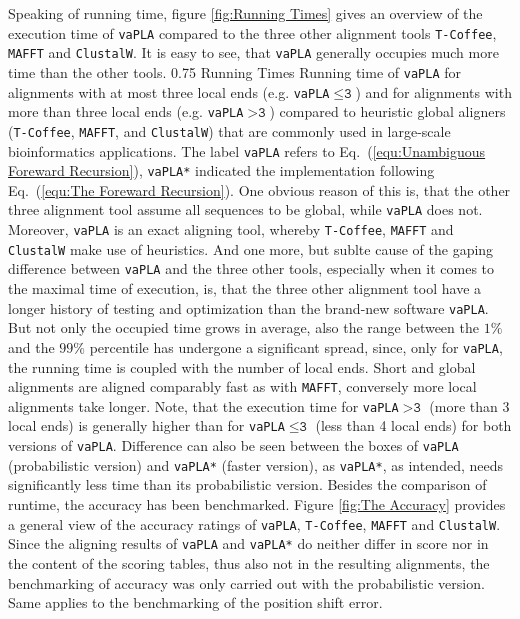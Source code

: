 \documentclass[a4paper,10pt]{thesis}
\newcommand{\software}{\texttt{vaPLA}}
\newcommand{\softwareS}{\software\born}
\newcommand{\softwareSmaller}{\software$\le\!\!\texttt{3}$}
\newcommand{\softwareBigger}{\software$>\!\!\texttt{3}$}
\newcommand{\born}{\texttt{*}}
\begin{document}
{{    Speaking of running time, figure \ref{fig:Running Times} gives an overview of the execution time of \software{} compared to the three other alignment tools \texttt{T-Coffee}, \texttt{MAFFT} and \texttt{ClustalW}. It is easy to see, that \software{} generally occupies much more time than the other tools.
    {0.75\textwidth}
    {Running Times}
    {Running time of \software{} for alignments with at most three local ends (e.g. \softwareSmaller{}) and for alignments with more than three local ends (e.g. \softwareBigger{}) compared to heuristic global aligners (\texttt{T-Coffee}, \texttt{MAFFT}, and \texttt{ClustalW}) that are commonly used in large-scale bioinformatics applications. The label \software{} refers to Eq.~(\ref{equ:Unambiguous Foreward Recursion}),  \softwareS{} indicated the implementation following Eq.~(\ref{equ:The Foreward Recursion}).}%
    One obvious reason of this is, that the other three alignment tool assume all sequences to be global, while \software{} does not. Moreover, \software{} is an exact aligning tool, whereby \texttt{T-Coffee}, \texttt{MAFFT} and \texttt{ClustalW} make use of heuristics. And one more, but sublte cause of the gaping difference between \software{} and the three other tools, especially when it comes to the maximal time of execution, is, that the three other alignment tool have a longer history of testing and optimization than the brand-new software \software{}.
    \gapSmall
    But not only the occupied time grows in average, also the range between the $1\%$ and the $99\%$ percentile has undergone a significant spread, since, only for \software{}, the running time is coupled with the number of local ends. Short and global alignments are aligned comparably fast as with \texttt{MAFFT}, conversely more local alignments take longer. Note, that the execution time for \softwareBigger{} (more than 3 local ends) is generally higher than for \softwareSmaller{} (less than 4 local ends) for both versions of \software{}. Difference can also be seen between the boxes of \software{} (probabilistic version) and \softwareS{} (faster version), as \softwareS{}, as intended, needs significantly less time than its probabilistic version. 
    \gapBig
    Besides the comparison of runtime, the accuracy has been benchmarked. Figure \ref{fig:The Accuracy} provides a general view of the accuracy ratings of \software{}, \texttt{T-Coffee}, \texttt{MAFFT} and \texttt{ClustalW}. Since the aligning results of \software{} and \softwareS{} do neither differ in score nor in the content of the scoring tables, thus also not in the resulting alignments, the benchmarking of accuracy was only carried out with the probabilistic version. Same applies to the benchmarking of the position shift error. 
}}
\end{document}
